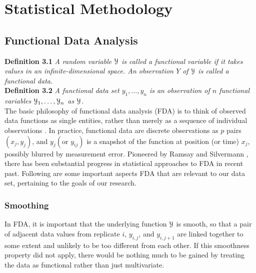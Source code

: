 \chapter{Statistical Methodology}

\section{Functional Data Analysis}
\noindent
{\bf{Definition 3.1}} {\emph{A random variable $\mathcal{Y}$ is called a functional variable if it takes values in an infinite-dimensional space. An observation $Y$ of $\mathcal{Y}$ is called a functional data. \cite{Ferraty_Vieu_2006_Nonparametric}}}\\
\noindent
{\bf{Definition 3.2}} {\emph{A functional data set $y_1, \dots, y_n$ is an observation of $n$ functional variables $\mathcal{Y}_1, \dots, \mathcal{Y}_n$ as $\mathcal{Y}$.}}\\

The basic philosophy of functional data analysis (FDA) is to think of observed data functions as single entities, rather than merely as a sequence of individual observations \cite{Ramsay_2006_Functional}. In
practice, functional data are discrete observations as $p$ pairs $(x_j, y_j)$, and $y_j (\text{or } y_{ij})$ is a snapshot of the function at position (or time) $x_j$, possibly blurred by measurement error. Pioneered by Ramsay and Silvermann \cite{Ramsay_2006_Functional}, there has been substantial progress in statistical approaches to FDA in recent past. Following are some important aspects FDA that are relevant to our data set, pertaining to the goals of our research. 

\subsection{Smoothing} \label{ch3_smooth}
In FDA, it is important that the underlying function $\mathcal{Y}$ is smooth, so that a pair of adjacent data values from replicate $i$, $y_{i,j}$, and $y_{i,j+1}$ are linked together to some extent and unlikely to be too different from each other. If this smoothness property did not apply, there would be nothing much to be gained by treating the data as functional rather than just multivariate. 

